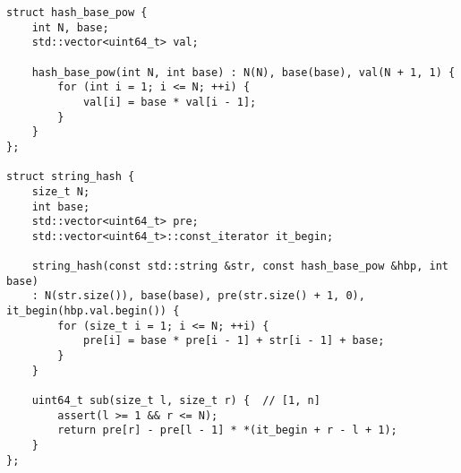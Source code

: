 \begin{lstlisting}
struct hash_base_pow {
	int N, base;
	std::vector<uint64_t> val;
	
	hash_base_pow(int N, int base) : N(N), base(base), val(N + 1, 1) {
		for (int i = 1; i <= N; ++i) {
			val[i] = base * val[i - 1];
		}
	}
};

struct string_hash {
	size_t N;
	int base;
	std::vector<uint64_t> pre;
	std::vector<uint64_t>::const_iterator it_begin;
	
	string_hash(const std::string &str, const hash_base_pow &hbp, int base)
	: N(str.size()), base(base), pre(str.size() + 1, 0), it_begin(hbp.val.begin()) {
		for (size_t i = 1; i <= N; ++i) {
			pre[i] = base * pre[i - 1] + str[i - 1] + base;
		}
	}
	
	uint64_t sub(size_t l, size_t r) {  // [1, n]
		assert(l >= 1 && r <= N);
		return pre[r] - pre[l - 1] * *(it_begin + r - l + 1);
	}
};
\end{lstlisting}
